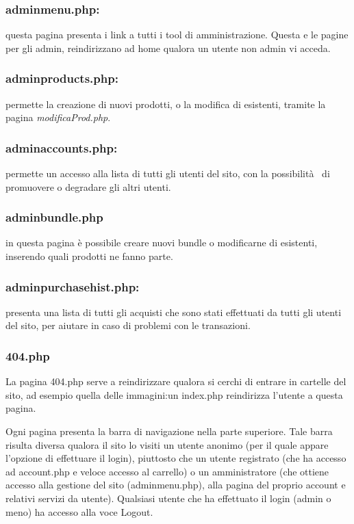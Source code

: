 \subsubsection{adminmenu.php:} \Spazio questa pagina presenta i link a tutti i tool di amministrazione. Questa e le pagine per gli admin, reindirizzano ad home qualora un utente non admin vi acceda.

\subsubsection{adminproducts.php:} \Spazio permette la creazione di nuovi prodotti, o la modifica di esistenti, tramite la pagina \textit{modificaProd.php}.

\subsubsection{adminaccounts.php:} \Spazio permette un accesso alla lista di tutti gli utenti del sito, con la possibilità  di promuovere o degradare gli altri utenti.

\subsubsection{adminbundle.php}\Spazio in questa pagina è possibile creare nuovi bundle o modificarne di esistenti, inserendo quali prodotti ne fanno parte.

\subsubsection{adminpurchasehist.php:} \Spazio presenta una lista di tutti gli acquisti che sono stati effettuati da tutti gli utenti del sito, per aiutare in caso di problemi con le transazioni.

\subsubsection{404.php} \Spazio
La pagina 404.php serve a reindirizzare qualora si cerchi di entrare in cartelle del sito, ad esempio quella delle immagini:un index.php reindirizza l'utente a questa pagina.


Ogni pagina presenta la barra di navigazione nella parte superiore. Tale barra risulta diversa qualora il sito lo visiti un utente anonimo (per il quale appare l'opzione di effettuare il login), piuttosto che un utente registrato (che ha accesso ad account.php e veloce accesso al carrello) o un amministratore (che ottiene accesso alla gestione del sito (adminmenu.php), alla pagina del proprio account e relativi servizi da utente). Qualsiasi utente che ha effettuato il login (admin o meno) ha accesso alla voce Logout.

